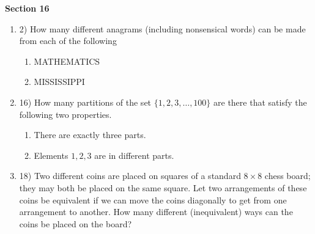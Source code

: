 \documentclass[11pt]{preprint}
\def\enumb{\begin{enumerate}}
\def\enume{\end{enumerate}}
\begin{document}
\textbf{Section 16}
\enumb

\item[2)] How many different anagrams (including nonsensical words) can be made from each of the following
\enumb
\item MATHEMATICS
\item MISSISSIPPI
\enume
\item[16)] How many partitions of the set $\{1,2,3,\dots,100\}$ are there that satisfy the following two properties.
\enumb
\item There are exactly three parts.
\item Elements $1,2, 3$ are in different parts.
\enume
\item[18)] Two different coins are placed on squares of a standard $8\times 8$ chess board; they may both be placed on the same square. Let two arrangements of these coins be equivalent if we can move the coins diagonally to get from one arrangement to another. How many different (inequivalent) ways can the coins be placed on the board?
\enume
\end{document}
